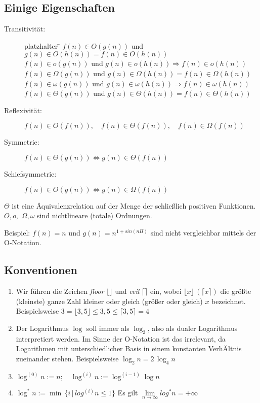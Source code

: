 \documentclass[ngerman]{scrreprt}%
\theoremstyle{break}
\begin{document}
\subsection{Einige Eigenschaften}
\begin{description}
\item[Transitivität:]
\begin{tabbing}
platzhalter \= \kill
        \> $f(n) \in O(g(n))$ und $g(n) \in O(h(n))=f(n) \in O(h(n))$\\
        \> $f(n) \in o(g(n))$ und $g(n) \in o(h(n)) \Rightarrow f(n) \in o(h(n))$\\
        \> $f(n) \in \Omega(g(n))$ und $g(n) \in \Omega(h(n))=f(n) \in \Omega(h(n))$\\
        \> $f(n) \in \omega(g(n))$ und $g(n) \in \omega(h(n)) \Rightarrow f(n) \in \omega(h(n))$\\
        \> $f(n) \in \Theta(g(n))$ und $g(n) \in \Theta(h(n))=f(n) \in \Theta(h(n))$
\end{tabbing}
\item[Reflexivität:]
        $f(n) \in O(f(n)), \quad f(n) \in \Theta(f(n)), \quad f(n) \in \Omega(f(n))$
\item[Symmetrie:]
        $f(n) \in \Theta(g(n)) \Leftrightarrow g(n) \in \Theta(f(n))$
\item[Schiefsymmetrie:]
        $f(n) \in O(g(n)) \Leftrightarrow g(n) \in \Omega(f(n))$
\end{description}
$\Theta$ ist eine Äquivalenzrelation auf der Menge der schließlich positiven Funktionen.
$O,o,$ $\Omega,\omega$ sind nichtlineare (totale) Ordnungen.

Beispiel: $f(n)=n$ und $g(n)=n^{1+sin(n\Pi)}$ sind nicht vergleichbar mittels der O-Notation.

\subsection{Konventionen}
\begin{enumerate}
\item   Wir führen die Zeichen \emph{floor} $ \lfloor \rfloor$ und \emph{ceil} $\lceil \rceil$ ein,
        wobei $\lfloor x \rfloor\,( \lceil x \rceil)$ die größte (kleinste) ganze Zahl kleiner oder gleich
        (größer oder gleich) $x$ bezeichnet. Beispielsweise $3=\lfloor 3,5\rfloor \leq 3,5 \leq \lceil 3,5 \rceil=4$
\item   Der Logarithmus $\log$ soll immer als $\log_2$, also als dualer Logarithmus interpretiert werden. Im Sinne der O-Notation ist das
irrelevant, da Logarithmen mit unterschiedlicher Basis in einem konstanten VerhÄltnis zueinander stehen. Beispielsweise $\log_2 n = 2\,\log_4 n$
\item   $\log^{(0)}n := n; \quad \log^{(i)}n := \log^{(i-1)}\log n$
\item   $\log^{*}n := \min\,\{i\,|\,log^{(i)}n \leq1 \}$ Es gilt $ \lim\limits_{n \rightarrow \infty}{log^{*}n} = + \infty$
\end{enumerate}
\end{document}
